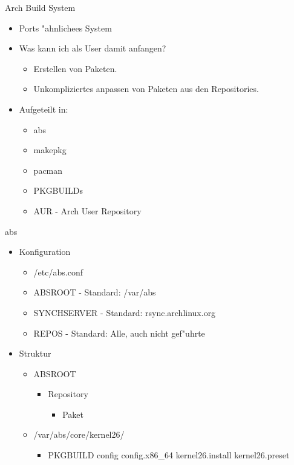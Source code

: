 
\begin{slide}{Arch Build System}
	\begin{itemize}
		\item{Ports "{a}hnlichees System}
		\item{Was kann ich als User damit anfangen?
			\begin{itemize}
				\item{Erstellen von Paketen.}
				\item{Unkompliziertes anpassen von Paketen aus den 
					Repositories.}
			\end{itemize}
		}
		\item{Aufgeteilt in:
			\begin{itemize}
				\item{abs}
				\item{makepkg}
				\item{pacman}
				\item{PKGBUILDs}
				\item{AUR - Arch User Repository}
			\end{itemize}
		}
	\end{itemize}
\end{slide}

\begin{slide}{abs}
	\begin{itemize}
		\item{Konfiguration
			\begin{itemize}
				\item{/etc/abs.conf}
				\item{ABSROOT -  Standard: /var/abs}
				\item{SYNCHSERVER - Standard: rsync.archlinux.org}
				\item{REPOS - Standard: Alle, auch nicht gef"{u}hrte}
			\end{itemize}
		}
		\item{Struktur
			\begin{itemize}
				\item{ABSROOT
					\begin{itemize}
						\item{Repository
							\begin{itemize}
								\item{Paket}
							\end{itemize}
						}
					\end{itemize}
				}
				\item{/var/abs/core/kernel26/
					\begin{itemize}
						\item{PKGBUILD config config.x86\_64 kernel26.install
							kernel26.preset}
					\end{itemize}
				}
			\end{itemize}
		}
	\end{itemize}
\end{slide}

